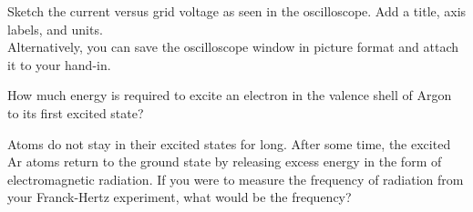\documentclass[addpoints]{physlabs} %
\begin{document}
\begin{postlab}

    \filbreak
    \question[2] Sketch the current versus grid voltage as seen in the oscilloscope. Add a title, axis labels, and units.\\[-1em]
    
    Alternatively, you can save the oscilloscope window in picture format and attach it to your hand-in.\\[0em]

    \begin{center}
    \captionsetup{font=normalsize}
    
    \end{center}


    \newpage
    
    \filbreak
    \question[1] How much energy is required to excite an electron in the valence shell of Argon to its first excited state?
    \begin{solution}[4cm]
        
    \end{solution}

    \filbreak
    \question[2] Atoms do not stay in their excited states for long. After some time, the excited Ar atoms return to the ground state by releasing excess energy in the form of electromagnetic radiation. If you were to measure the frequency of radiation from your Franck-Hertz experiment, what would be the frequency?
    \begin{solution}[5cm]
        

\end{solution}
\end{postlab}
\end{document}
